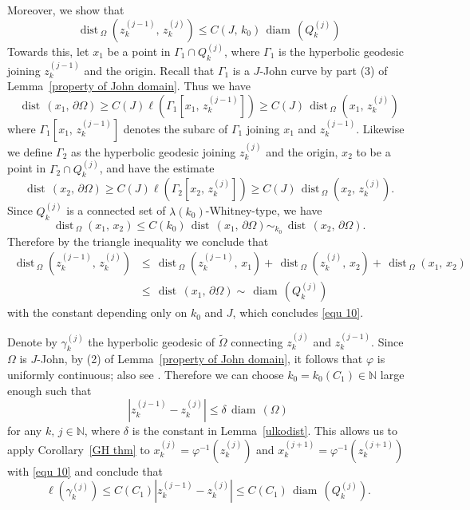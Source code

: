 \documentclass[reqno,11pt]{amsart}
\def\dist{{\mathop\mathrm{\,dist\,}}}
\def\wz{\widetilde}
\def\diam{{\mathop\mathrm{\,diam\,}}}
\numberwithin{equation}{section}
\theoremstyle{remark}
\begin{document}
Moreover, we show that
\begin{equation}\label{equ 10}
 \dist_{\Omega}(z^{(j-1)}_k,\,z^{(j)}_k)\le C(J,\,k_0) \diam(Q^{(j)}_k) 
\end{equation}
Towards this, let $x_1$ be a point in $\Gamma_1\cap Q^{(j)}_k$, where $\Gamma_1$ is the hyperbolic geodesic joining $z^{(j-1)}_k$ and the origin. Recall that $\Gamma_1$ is a $J$-John curve by part (3) of Lemma~\ref{property of John domain}. Thus we have
$$\dist(x_1,\,\partial \Omega)\ge C(J) \ell(\Gamma_1[x_1,\,z^{(j-1)}_k])\ge C(J) \dist_{\Omega}(x_1,\,z^{(j)}_k)$$
where $\Gamma_1[x_1,\,z^{(j-1)}_k]$ denotes the subarc of $\Gamma_1$ joining $x_1$ and $z^{(j-1)}_k$. Likewise we define $\Gamma_2$ as the hyperbolic geodesic joining $z^{(j)}_k$ and the origin, $x_2$ to be a point in $\Gamma_2\cap Q^{(j)}_k$, and have the estimate
$$\dist(x_2,\,\partial \Omega)\ge C(J) \ell(\Gamma_2[x_2,\,z^{(j)}_k])\ge C(J) \dist_{\Omega}(x_2,\,z^{(j)}_k). $$
Since $Q^{(j)}_k$ is a connected set of $\lambda(k_0)$-Whitney-type, we have
$$\dist_{\Omega}(x_1,\,x_2)\le C(k_0) \dist(x_1,\,\partial \Omega)\sim_{k_0} \dist(x_2,\,\partial \Omega). $$
Therefore by the triangle inequality we conclude that
\begin{align*}
\dist_{\Omega}(z^{(j-1)}_k,\,z^{(j)}_k) & \le \dist_{\Omega}(z^{(j-1)}_k,\,x_1)+ \dist_{\Omega}(z^{(j)}_k,\,x_2)+ \dist_{\Omega}(x_1,\,x_2)\\
&\le \dist(x_1,\,\partial \Omega)\sim \diam(Q^{(j)}_k)
\end{align*}
with the constant depending only on $k_0$ and $J$, which concludes \eqref{equ 10}.


Denote by $\gamma_k^{(j)}$ the hyperbolic geodesic of $\wz \Omega$ connecting $z^{(j)}_k$ and $z^{(j-1)}_k$. 
Since $\Omega$ is $J$-John,   by (2) of Lemma~\ref{property of John domain}, it follows that $\varphi$ is uniformly continuous; also see \cite[Page 100,\,Corollary 5.3]{P1992}.
Therefore we can choose $k_0=k_0(C_1)\in \mathbb N$ large enough such that
$$|z^{(j-1)}_k-z^{(j)}_k|\le \delta \diam(\Omega)$$
for any $k,\,j\in \mathbb N$, where $\delta$ is the constant in Lemma~\ref{ulkodist}. This allows us to apply Corollary~\ref{GH thm}   to $x^{(j)}_k=\varphi^{-1}(z^{(j)}_k)$ and $x^{(j+1)}_k=\varphi^{-1}(z^{(j+1)}_k)$   with \eqref{equ 10} and conclude that
\begin{equation}\label{distance estimate}
\ell(\gamma_k^{(j)})\le C(C_1) |z_{k}^{(j-1)} - z_{k}^{(j)}|\le C(C_1) \diam(Q_{k}^{(j)}). 
\end{equation}
\end{document}
